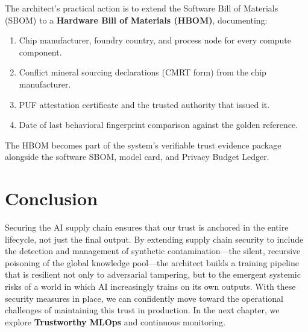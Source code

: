 The architect's practical action is to extend the Software Bill of Materials (SBOM) to a \textbf{Hardware Bill of Materials (HBOM)}, documenting:
\begin{enumerate}
  \item Chip manufacturer, foundry country, and process node for every compute component.
  \item Conflict mineral sourcing declarations (CMRT form) from the chip manufacturer.
  \item PUF attestation certificate and the trusted authority that issued it.
  \item Date of last behavioral fingerprint comparison against the golden reference.
\end{enumerate}

The HBOM becomes part of the system's verifiable trust evidence package alongside the software SBOM, model card, and Privacy Budget Ledger.

\section{Conclusion}
\label{sec:conclusion_supply_chain}

Securing the AI supply chain ensures that our trust is anchored in the entire lifecycle, not just the final output. By extending supply chain security to include the detection and management of synthetic contamination---the silent, recursive poisoning of the global knowledge pool---the architect builds a training pipeline that is resilient not only to adversarial tampering, but to the emergent systemic risks of a world in which AI increasingly trains on its own outputs. With these security measures in place, we can confidently move toward the operational challenges of maintaining this trust in production. In the next chapter, we explore \textbf{Trustworthy MLOps} and continuous monitoring.


